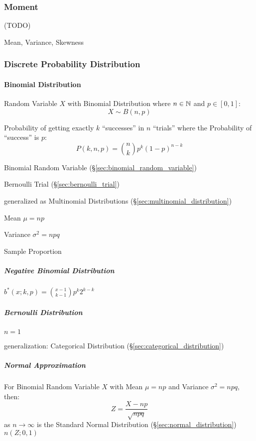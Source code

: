 \subsubsection{Moment}\label{sec:moment}

(TODO)

Mean, Variance, Skewness



\subsubsection{Discrete Probability Distribution}
\label{sec:discrete_probability}

\paragraph{Binomial Distribution}\label{sec:binomial_distribution}\hfill

Random Variable $X$ with Binomial Distribution where $n \in \mathbb{N}$ and
$p \in [0,1]$:
\[
  X \sim B(n,p)
\]

Probability of getting exactly $k$ ``successes'' in $n$ ``trials'' where the
Probability of ``success'' is $p$:
\[
  P(k,n,p) = \binom{n}{k}p^k(1-p)^{n-k}
\]

Binomial Random Variable (\S\ref{sec:binomial_random_variable})

Bernoulli Trial (\S\ref{sec:bernoulli_trial})

generalized as Multinomial Distributions (\S\ref{sec:multinomial_distribution})

Mean $\mu = n p$

Variance $\sigma^2 = n p q$

Sample Proportion %



\subparagraph{Negative Binomial Distribution}\hfill
\label{sec:negative_binomial}

$b^*(x; k,p) = \binom{x-1}{k-1} p^k 2^{k-k}$



\subparagraph{Bernoulli Distribution}\label{sec:bernoulli_distribution}\hfill

$n = 1$

generalization: Categorical Distribution (\S\ref{sec:categorical_distribution})



\subparagraph{Normal Approximation}\label{sec:normal_approximation}\hfill

For Binomial Random Variable $X$ with Mean $\mu = np$ and Variance
$\sigma^2 = npq$, then:
\[
  Z = \frac{X - np}{\sqrt{npq}}
\]
as $n \rightarrow \infty$ is the Standard Normal Distribution
(\S\ref{sec:normal_distribution}) $n(Z;0,1)$



